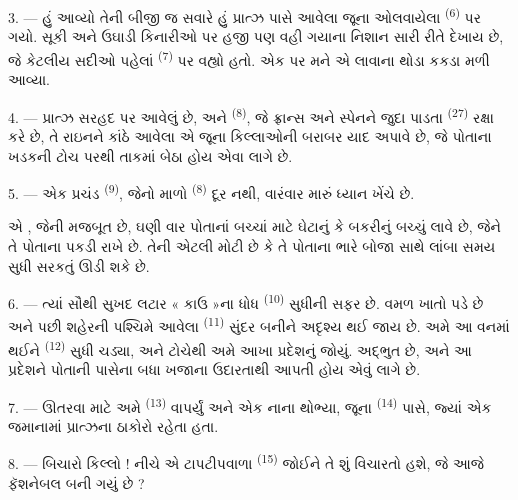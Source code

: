 \VUsaut{3.0mm}
\VUsaut{3.0mm}

3. --- હું આવ્યો તેની બીજી જ સવારે હું પ્રાત્ઝ પાસે આવેલા જૂના ઓલવાયેલા
 \textsuperscript{(6)} પર ગયો.  સૂકી અને ઉઘાડી કિનારીઓ પર હજી પણ  વહી ગયાના
નિશાન સારી રીતે દેખાય છે, જે કેટલીય સદીઓ પહેલાં  \textsuperscript{(7)} પર વહ્યો હતો. એક  પર મને
એ લાવાના થોડા કકડા મળી આવ્યા.

4. --- પ્રાત્ઝ સરહદ પર આવેલું છે, અને 
\textsuperscript{(8)}, જે ફ્રાન્સ અને સ્પેનને જુદા પાડતા 
\textsuperscript{(27)} રક્ષા કરે છે, તે રાઇનને કાંઠે આવેલા એ જૂના
કિલ્લાઓની બરાબર યાદ અપાવે છે, જે પોતાના ખડકની ટોચ પરથી
 તાકમાં બેઠા હોય એવા લાગે છે.

5. --- એક પ્રચંડ  \textsuperscript{(9)}, જેનો માળો
 \textsuperscript{(8)} દૂર નથી, વારંવાર મારું ધ્યાન
ખેંચે છે.

એ , જેની  મજબૂત છે, ઘણી વાર પોતાનાં
બચ્ચાં માટે ઘેટાનું કે બકરીનું બચ્ચું લાવે છે, જેને તે પોતાના
 પકડી રાખે છે. તેની  એટલી મોટી છે કે તે
પોતાના ભારે બોજા સાથે લાંબા સમય સુધી સરકતું ઊડી શકે છે.

\VUsaut{3.0mm}
\VUsaut{3.0mm}

6. --- ત્યાં સૌથી સુખદ લટાર « કાઉ »ના ધોધ \textsuperscript{(10)} સુધીની
સફર છે.  વમળ ખાતો પડે છે અને પછી શહેરની પશ્ચિમે આવેલા
 \textsuperscript{(11)} સુંદર  બનીને
અદૃશ્ય થઈ જાય છે. અમે આ વનમાં થઈને 
\textsuperscript{(12)} સુધી ચડ્યા, અને  ટોચેથી અમે
આખા પ્રદેશનું  જોયું. 
અદ્ભુત છે, અને  આ પ્રદેશને પોતાની પાસેના બધા ખજાના
ઉદારતાથી આપતી હોય એવું લાગે છે.

7. --- ઊતરવા માટે અમે  \textsuperscript{(13)}
વાપર્યું અને એક નાના  થોભ્યા, જૂના   \textsuperscript{(14)} પાસે, જ્યાં એક જમાનામાં
પ્રાત્ઝના ઠાકોરો રહેતા હતા.

8. --- બિચારો કિલ્લો ! નીચે એ ટાપટીપવાળા 
\textsuperscript{(15)} જોઈને તે શું વિચારતો હશે, જે આજે ફૅશનેબલ
 બની ગયું છે ?

